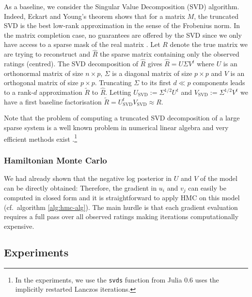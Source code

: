As a baseline, we consider the Singular Value Decomposition (SVD) algorithm. Indeed, Eckart and Young's theorem shows that for a matrix $M$, the truncated SVD is the best low-rank approximation in the sense of the Frobenius norm. In the matrix completion case, no guarantees are offered by the SVD since we only have access to a sparse mask of the real matrix \citep{srebro04}. Let $R$ denote the true matrix we are trying to reconstruct and $\hat R$ the sparse matrix containing only the observed ratings (centred). The SVD decomposition of $\hat R$ gives $\hat R = U\Sigma V^{t}$ where $U$ is an orthonormal matrix of size $n\times p$, $\Sigma$ is a diagonal matrix of size $p\times p$ and $V$ is an orthogonal matrix of size $p\times p$. Truncating $\Sigma$ to its first $d\ll p$ components leads to a rank-$d$ approximation $\tilde R$ to $\hat R$. 
Letting $U_{\text{SVD}}:=\Sigma^{1/2}U^{t}$ and $V_{\text{SVD}}:=\Sigma^{1/2}V^{t}$ we have a first baseline factorisation $\tilde R=U_{\text{SVD}}^{t}V_{\text{SVD}}\approx R$.

Note that the problem of computing a truncated SVD decomposition of a large sparse system is a well known problem in numerical linear algebra and very efficient methods exist \citep{sorensen96}.\footnote{In the experiments, we use the \texttt{svds} function from Julia 0.6 uses the implicitly restarted Lanczos iterations.} 

\subsubsection{Hamiltonian Monte Carlo}

We had already shown that the negative log posterior in $U$ and $V$ of the model can be directly obtained:
Therefore, the gradient in $u_{i}$ and $v_{j}$ can easily be computed in closed form and it is straightforward to apply HMC on this model (cf.\ algorithm \ref{alg:hmc-alg}). The main hurdle is that each gradient evaluation requires a full pass over all observed ratings making iterations computationally expensive. 

\subsection{Experiments}

